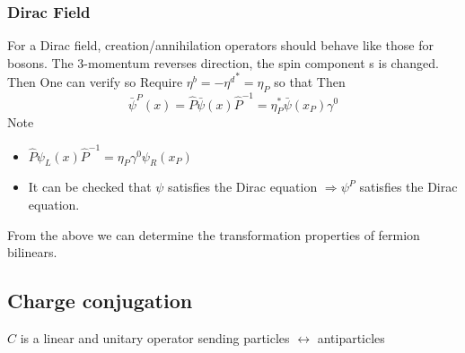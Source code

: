 \documentclass{article}
\begin{document}
\subsubsection*{Dirac Field}
For a Dirac field, creation/annihilation operators should behave like those for bosons. The 3-momentum reverses direction, the spin component s is changed. 
Then
One can verify
so 
Require $\eta^b = -{\eta^d}^\ast=\eta_P$ so that 
Then 
\[
\bar{\psi}^P(x) = \hat{P}\bar{\psi}(x) \hat{P}^{-1} = \eta_P^\ast \bar\psi(x_P) \gamma^0
\]
Note 
\begin{itemize}
    \item $\hat{P} \psi_L(x) \hat{P}^{-1} = \eta_P \gamma^0 \psi_R(x_P)$ 
    \item It can be checked that $\psi$ satisfies the Dirac equation $\Rightarrow \psi^P$ satisfies the Dirac equation.  
\end{itemize}
From the above we can determine the transformation properties of fermion bilinears. 

\subsection{Charge conjugation}
$\hat{C}$ is a linear and unitary operator sending particles $\leftrightarrow$ antiparticles 
\end{document}
